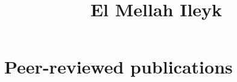 
\renewcommand*\rmdefault{iwona}

\renewcommand \thesection{\colorulem[red]{\Roman{section}}}
\renewcommand \thesubsection{\Roman{section}.\colorulem[green]{\arabic{subsection}}}

\newcommand{\horrule}[1]{\rule{\linewidth}{#1}} %

\title{	
\vspace*{-2cm}
\normalfont \normalsize 
El Mellah Ileyk \\ [25pt] %
}
%
%
\date{} %




\maketitle
\thispagestyle{empty}
\vspace*{-4cm}
\section*{Peer-reviewed publications}

